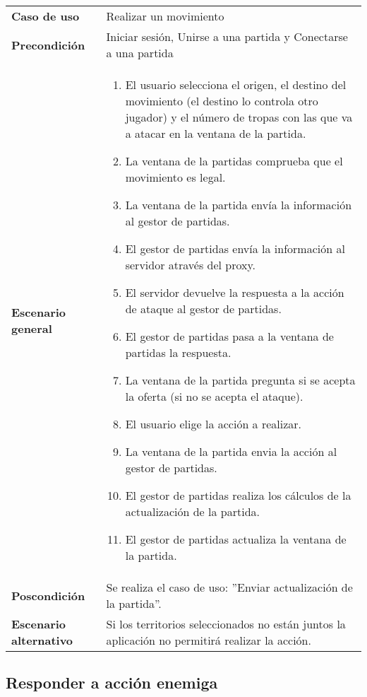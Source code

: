 {\footnotesize
\begin{tabularx}{0.95\textwidth}{p{}|X}

\textbf{Caso de uso} & Realizar un movimiento \\

\textbf{Precondición} & Iniciar sesión, Unirse a una partida y Conectarse a una
partida \\

\textbf{Escenario general} & \begin{enumerate}
\item El usuario selecciona el origen, el destino del movimiento (el destino
lo controla otro jugador) y el número de tropas con las que va a atacar en la
ventana de la partida.
\item La ventana de la partidas comprueba que el movimiento es legal.
\item La ventana de la partida envía la información al gestor de partidas.
\item El gestor de partidas envía la información al servidor através del proxy.
\item El servidor devuelve la respuesta a la acción de ataque al gestor de
partidas.
\item El gestor de partidas pasa a la ventana de partidas la respuesta.
\item La ventana de la partida pregunta si se acepta la oferta (si no se acepta
el ataque).
\item El usuario elige la acción a realizar.
\item La ventana de la partida envia la acción al gestor de partidas.
\item El gestor de partidas realiza los cálculos de la actualización de la
partida.
\item El gestor de partidas actualiza la ventana de la partida.
\end{enumerate} \\

\textbf{Poscondición} & Se realiza el caso de uso: ''Enviar actualización de la
partida''.\\

\textbf{Escenario alternativo} & Si los territorios seleccionados no están
juntos la aplicación no permitirá realizar la acción.\\

\end{tabularx}
}

\subsection{Responder a acción enemiga}

